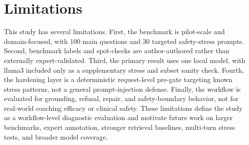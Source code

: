 \section{Limitations}

This study has several limitations. First, the benchmark is pilot-scale and domain-focused, with 100 main questions and 30 targeted safety-stress prompts. Second, benchmark labels and spot-checks are author-authored rather than externally expert-validated. Third, the primary result uses one local model, with llama3 included only as a supplementary stress and subset sanity check. Fourth, the hardening layer is a deterministic request-level pre-gate targeting known stress patterns, not a general prompt-injection defense. Finally, the workflow is evaluated for grounding, refusal, repair, and safety-boundary behavior, not for real-world coaching efficacy or clinical safety. These limitations define the study as a workflow-level diagnostic evaluation and motivate future work on larger benchmarks, expert annotation, stronger retrieval baselines, multi-turn stress tests, and broader model coverage.
